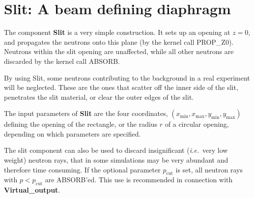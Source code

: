 \section{Slit: A beam defining diaphragm}
\label{slit}


The component \textbf{Slit} is a very simple construction.
It sets up an opening at $z=0$, and propagates the neutrons
onto this plane (by the kernel call PROP\_Z0).
Neutrons within the slit opening are unaffected,
while all other neutrons
are discarded by the kernel call ABSORB.

By using \textrm{Slit}, some neutrons contributing to the background
in a real experiment will be neglected.
These are the ones that scatter off the inner side
of the slit, penetrates the slit material,
or clear the outer edges of the slit.

The input parameters of \textbf{Slit} are the four coordinates,
$(x_\textrm{min}, x_\textrm{max}, y_\textrm{min}, y_\textrm{max})$
defining the opening of the rectangle, or the radius $r$ of
a circular opening, depending on which parameters are specified.

The slit component can also be used to discard insignificant 
({\em i.e.}\ very low weight)
neutron rays, that in some simulations may be very abundant and therefore
time consuming. If the optional parameter $p_\textrm{cut}$ is set, all
neutron rays with $p<p_\textrm{cut}$ are ABSORB'ed.
This use is recommended in connection with \textbf{Virtual\_output}.


